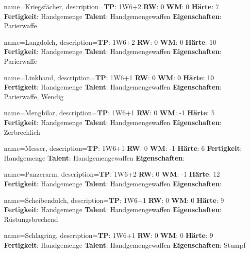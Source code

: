 {
    name={Kriegsfächer},
    description={\textbf{TP}: 1W6+2 \textbf{RW}: 0 \textbf{WM}: 0 \textbf{Härte}: 7        \textbf{Fertigkeit}: Handgemenge \textbf{Talent}: Handgemengewaffen \textbf{{Eigenschaften}}: Parierwaffe}
}



{
    name={Langdolch},
    description={\textbf{TP}: 1W6+2 \textbf{RW}: 0 \textbf{WM}: 0 \textbf{Härte}: 10        \textbf{Fertigkeit}: Handgemenge \textbf{Talent}: Handgemengewaffen \textbf{{Eigenschaften}}: Parierwaffe}
}



{
    name={Linkhand},
    description={\textbf{TP}: 1W6+1 \textbf{RW}: 0 \textbf{WM}: 0 \textbf{Härte}: 10        \textbf{Fertigkeit}: Handgemenge \textbf{Talent}: Handgemengewaffen \textbf{{Eigenschaften}}: Parierwaffe, Wendig}
}



{
    name={Mengbilar},
    description={\textbf{TP}: 1W6+1 \textbf{RW}: 0 \textbf{WM}: -1 \textbf{Härte}: 5        \textbf{Fertigkeit}: Handgemenge \textbf{Talent}: Handgemengewaffen \textbf{{Eigenschaften}}: Zerbrechlich}
}



{
    name={Messer},
    description={\textbf{TP}: 1W6+1 \textbf{RW}: 0 \textbf{WM}: -1 \textbf{Härte}: 6        \textbf{Fertigkeit}: Handgemenge \textbf{Talent}: Handgemengewaffen \textbf{{Eigenschaften}}: }
}



{
    name={Panzerarm},
    description={\textbf{TP}: 1W6+2 \textbf{RW}: 0 \textbf{WM}: -1 \textbf{Härte}: 12        \textbf{Fertigkeit}: Handgemenge \textbf{Talent}: Handgemengewaffen \textbf{{Eigenschaften}}: }
}



{
    name={Scheibendolch},
    description={\textbf{TP}: 1W6+1 \textbf{RW}: 0 \textbf{WM}: 0 \textbf{Härte}: 9        \textbf{Fertigkeit}: Handgemenge \textbf{Talent}: Handgemengewaffen \textbf{{Eigenschaften}}: Rüstungsbrechend}
}



{
    name={Schlagring},
    description={\textbf{TP}: 1W6+1 \textbf{RW}: 0 \textbf{WM}: 0 \textbf{Härte}: 9        \textbf{Fertigkeit}: Handgemenge \textbf{Talent}: Handgemengewaffen \textbf{{Eigenschaften}}: Stumpf}
}



